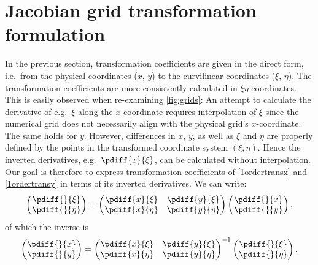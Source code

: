 \section{Jacobian grid transformation formulation}
In the previous section, transformation coefficients are given in the direct form, i.e.\ from the physical coordinates ($x$, $y$) to the curvilinear coordinates ($\xi$, $\eta$).
The transformation coefficients are more consistently calculated in $\xi\eta$-coordinates.
This is easily observed when re-examining \autoref{fig:grids}: An attempt to calculate the derivative of e.g.\ $\xi$ along the $x$-coordinate requires interpolation of $\xi$ since the numerical grid does not necessarily align with the physical grid's $x$-coordinate.
The same holds for $y$.
However, differences in $x$, $y$, as well as $\xi$ and $\eta$ are properly defined by the points in the transformed coordinate system $(\xi,\eta)$.
Hence the inverted derivatives, e.g.\ $\pdiff{x}{\xi}$, can be calculated without interpolation.
Our goal is therefore to express transformation coefficients of \autoref{1ordertransx} and \eqref{1ordertransy} in terms of its inverted derivatives.
We can write:
%
\begin{align}
	\begin{pmatrix} \pdiff{}{\xi} \\ \pdiff{}{\eta} \end{pmatrix}
	=
	\begin{pmatrix}
		\pdiff{x}{\xi} &
		\pdiff{y}{\xi} \\
		\pdiff{x}{\eta} &
		\pdiff{y}{\eta}
	\end{pmatrix}
	\begin{pmatrix} \pdiff{}{x} \\ \pdiff{}{y} \end{pmatrix},
\end{align}
%
of which the inverse is
%
\begin{align}\label{inversetransformation}
	\begin{pmatrix} \pdiff{}{x} \\ \pdiff{}{y} \end{pmatrix}
	=
	\begin{pmatrix}
		\pdiff{x}{\xi} &
		\pdiff{y}{\xi} \\
		\pdiff{x}{\eta} &
		\pdiff{y}{\eta}
	\end{pmatrix}^{-1}
	\begin{pmatrix} \pdiff{}{\xi} \\ \pdiff{}{\eta} \end{pmatrix}.
\end{align}
